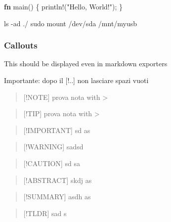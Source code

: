 \documentclass[
]{article}
\newenvironment{Shaded}{}{}
\newcommand{\AttributeTok}[1]{\textcolor[rgb]{0.49,0.56,0.16}{#1}}
\newcommand{\FunctionTok}[1]{\textcolor[rgb]{0.02,0.16,0.49}{#1}}
\newcommand{\KeywordTok}[1]{\textcolor[rgb]{0.00,0.44,0.13}{\textbf{#1}}}
\newcommand{\NormalTok}[1]{#1}
\newcommand{\OperatorTok}[1]{\textcolor[rgb]{0.40,0.40,0.40}{#1}}
\newcommand{\PreprocessorTok}[1]{\textcolor[rgb]{0.74,0.48,0.00}{#1}}
\newcommand{\StringTok}[1]{\textcolor[rgb]{0.25,0.44,0.63}{#1}}
\begin{document}
\begin{Shaded}
\begin{Highlighting}[]
\KeywordTok{fn}\NormalTok{ main() }\OperatorTok{\{}
    \PreprocessorTok{println!}\NormalTok{(}\StringTok{"Hello, World!"}\NormalTok{)}\OperatorTok{;}
\OperatorTok{\}}
\end{Highlighting}
\end{Shaded}

\begin{Shaded}
\begin{Highlighting}[]
\FunctionTok{ls} \AttributeTok{{-}ad}\NormalTok{ ./}
\FunctionTok{sudo}\NormalTok{ mount /dev/sda /mnt/myusb}
\end{Highlighting}
\end{Shaded}

\subsubsection{Callouts}\label{callouts}

This should be displayed even in markdown exporters

Importante: dopo il {[}!..{]} non lasciare spazi vuoti

\begin{quote}
{[}!NOTE{]} prova nota with \textgreater{}
\end{quote}

\begin{quote}
{[}!TIP{]} prova nota with \textgreater{}
\end{quote}

\begin{quote}
{[}!IMPORTANT{]} sd as
\end{quote}

\begin{quote}
{[}!WARNING{]} sadsd
\end{quote}

\begin{quote}
{[}!CAUTION{]} sd sa
\end{quote}

\begin{quote}
{[}!ABSTRACT{]} skdj as
\end{quote}

\begin{quote}
{[}!SUMMARY{]} asdh as
\end{quote}

\begin{quote}
{[}!TLDR{]} sad s
\end{quote}
\end{document}
